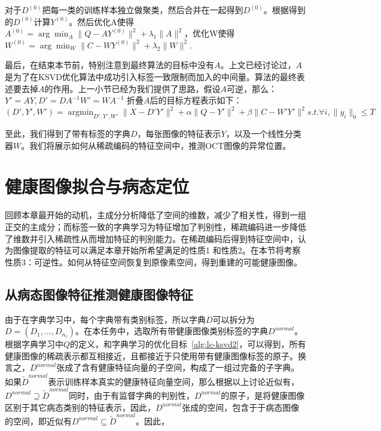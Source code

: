     对于$D^{(0)}$把每一类的训练样本独立做聚类，然后合并在一起得到$D^{(0)}$。根据得到的$D^{(0)}$计算$Y^{(0)}$。然后优化A使得 $A^{(0)} = \arg\min _{A} \|Q - AY^{(0)}\|^2 + \lambda_1 \|A\|^2$，优化W使得$W^{(0)} = \arg\min_{W} \|C - WY^{(0)}\|^2+ \lambda_2\|W\|^2$.

    最后，在结束本节前，特别注意到最终算法的目标中没有$A$。上文已经讨论过，$A$是为了在KSVD优化算法中成功引入标签一致限制而加入的中间量。算法的最终表述要去掉$A$的作用。上一小节已经为我们提供了思路，假设$A$可逆，那么：$Y' = AY, D' = D A^{-1} W' = W A^{-1}$ 折叠$A$后的目标方程表示如下：
    \begin{equation}
    \label{alg:lc-ksvd3}
    (D', Y', W') = \mathop{\arg\min}_{D', Y', W'} \| X - D'Y'\|^2 + \alpha \|Q - Y'\| ^2 + \beta\|C - W' Y' \| ^2 s.t. \forall i, \|y_i\|_0 \le T 
    \end{equation}

    至此，我们得到了带有标签的字典$D$，每张图像的特征表示$Y$，以及一个线性分类器$W$。我们将展示如何从稀疏编码的特征空间中，推测OCT图像的异常位置。

\section{健康图像拟合与病态定位}
\label{sec:norm-recon}
    回顾本章最开始的动机，主成分分析降低了空间的维数，减少了相关性，得到一组正交的主成分；而标签一致的字典学习为特征增加了判别性，稀疏编码进一步降低了维数并引入稀疏性从而增加特征的判别能力。在稀疏编码后得到特征空间中，认为图像提取的特征可以满足本章开始所希望满足的性质1 和性质2。在本节将考察性质3：可逆性。如何从特征空间恢复到原像素空间，得到重建的可能健康图像。

    \subsection{从病态图像特征推测健康图像特征}
    由于在字典学习中，每个字典带有类别标签，所以字典$D$可以拆分为$D = (D_1, \dots, D_{n_c})$。在本任务中，选取所有带健康图像类别标签的字典$D^{normal}$。根据字典学习中$Q$的定义，和字典学习的优化目标~\ref{alg:lc-ksvd2}，可以得到，所有健康图像的稀疏表示都互相接近，且都接近于只使用带有健康图像标签的原子。换言之，$D^{normal}$张成了含有健康特征向量的子空间，构成了一组过完备的子字典。如果$\tilde{D}^{normal}$表示训练样本真实的健康特征向量空间，那么根据以上讨论近似有，$D^{normal} \supseteq \tilde{D}^{normal}$同时，由于有监督字典的判别性，$D^{normal}$的原子，是将健康图像区别于其它病态类别的特征表示，因此，$D^{normal}$张成的空间，包含于于病态图像的空间，即近似有$D^{normal} \subseteq \tilde{D}^{normal}$。因此，

